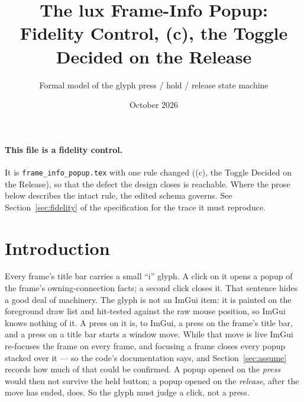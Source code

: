 \documentclass[a4paper,10pt,fleqn]{article}
\begin{document}
\title{The lux Frame-Info Popup: Fidelity Control, (c), the Toggle Decided on the Release}
\author{Formal model of the glyph press / hold / release state machine}
\date{October 2026}
\maketitle

\paragraph{This file is a fidelity control.}
It is \texttt{frame\_info\_popup.tex} with one rule changed ((c), the Toggle Decided on the Release), so that
the defect the design closes is reachable.  Where the prose below describes
the intact rule, the edited schema governs.  See Section~\ref{sec:fidelity} of
the specification for the trace it must reproduce.

\section{Introduction}

Every frame's title bar carries a small ``i'' glyph.  A click on it opens a
popup of the frame's owning-connection facts; a second click closes it.  That
sentence hides a good deal of machinery.  The glyph is not an ImGui item: it is
painted on the foreground draw list and hit-tested against the raw mouse
position, so ImGui knows nothing of it.  A press on it is, to ImGui, a press on
the frame's title bar, and a press on a title bar starts a window move.  While
that move is live ImGui re-focuses the frame on every frame, and focusing a
frame closes every popup stacked over it --- so the code's documentation says,
and Section~\ref{sec:assume} records how much of that could be confirmed.  A
popup opened on the \emph{press} would then not survive the held button; a
popup opened on the \emph{release}, after the move has ended, does.  So the glyph
must judge a click, not a press.
\end{document}
